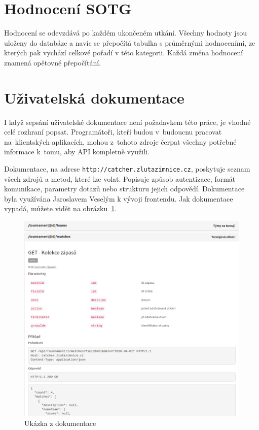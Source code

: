 \section{Hodnocení SOTG}

Hodnocení se odevzdává po každém ukončeném utkání. Všechny hodnoty jsou uloženy do databáze
a navíc se přepočítá tabulka s průměrnými hodnoceními, ze kterých pak vychází celkové pořadí v této kategorii.
Každá změna hodnocení znamená opětovné přepočítání.

\section{Uživatelská dokumentace}


I když sepsání uživatelské dokumentace není požadavkem této práce, je vhodné celé rozhraní popsat.
Programátoři, kteří budou v~budoucnu pracovat na~klient\-ských aplikacích, mohou z~tohoto zdroje čerpat všechny potřebné informace k~tomu, aby API kompletně využili.

Dokumentace, na adrese \texttt{http://catcher.zlutazimnice.cz},
poskytuje seznam všech zdrojů a metod, které lze volat. Popisuje způsob autentizace,
formát komunikace, parametry dotazů nebo strukturu jejich odpovědí.
Dokumentace byla využívána Jaroslavem Veselým k vývoji frontendu. Jak dokumentace vypadá, můžete vidět na obrázku~\ref{fig:doc}.

\begin{figure}[ht!]
\centering
\includegraphics[width=130mm]{./images/doc.png}
\caption{Ukázka z dokumentace\label{overflow}}
\label{fig:doc}
\end{figure}